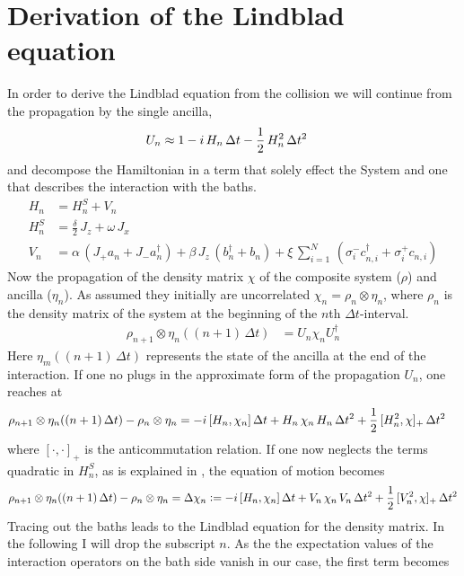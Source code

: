 \documentclass{article}
\begin{document}
\section{Derivation of the Lindblad equation}
In order to derive the Lindblad equation from the collision we will continue from the propagation by the single ancilla,
\begin{align*}
    U_n &\approx 1-i\,H_n \,\Delta t-\frac{1}{2}\,H_n^2\,\Delta t^2
\end{align*}
and decompose the Hamiltonian in a term that solely effect the System and one that describes the interaction with the baths.
\begin{align*}
    H_n &= H_n^S + V_n\\
    H_n^S&=\frac{\delta}{2}\,J_z+\omega\,J_x\\
    V_n&= \alpha\,(J_+a_n + J_-a_n^\dagger)+ \beta\,J_z\,(b_n^\dagger+b_n)+\xi\,\sum_{i=1}^N\,(\sigma_{i}^-c_{n,i}^\dagger+\sigma_i^+c_{n,i})
\end{align*}
Now the propagation of the density matrix $\chi$ of the composite system ($\rho$) and ancilla ($\eta_n$). As assumed they initially are uncorrelated $\chi_n=\rho_n\otimes\eta_n$, where $\rho_n$ is the density matrix of the system at the beginning of the $n$th $\Delta t$-interval.
\begin{align*}
    \rho_{n+1}\otimes\eta_n((n+1)\,\Delta t)&=U_n\chi_nU_n^\dagger
\end{align*}
Here $\eta_m((n+1)\,\Delta t)$ represents the state of the ancilla at the end of the interaction.
If one no plugs in the approximate form of the propagation $U_n$, one reaches at
\begin{align*}
    \rho_{n+1}\otimes\eta_n((n+1)\,\Delta t)-\rho_n\otimes\eta_n&=-i\,[H_n,\chi_n]\,\Delta t+H_n\,\chi_n\,H_n\,\Delta t^2+\frac{1}{2}\,[H_n^2,\chi]_+\,\Delta t^2
\end{align*}
where $[\cdot,\cdot]_+$ is the anticommutation relation. If one now neglects the terms quadratic in $H_n^S$, as is explained in \cite{ciccarello_cm}, the equation of motion becomes
\begin{align*}
    \rho_{n+1}\otimes\eta_n((n+1)\,\Delta t)-\rho_n\otimes\eta_n=\Delta\chi_n\vcentcolon=-i\,[H_n,\chi_n]\,\Delta t+V_n\,\chi_n\,V_n\,\Delta t^2+\frac{1}{2}\,[V_n^2,\chi]_+\,\Delta t^2
\end{align*}
Tracing out the baths leads to the Lindblad equation for the density matrix. In the following I will drop the subscript $n$. As the the expectation values of the interaction operators on the bath side vanish in our case, the first term becomes
\end{document}

